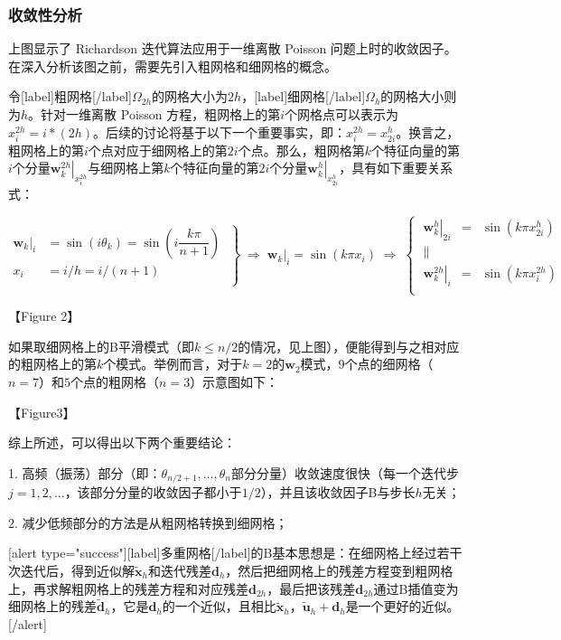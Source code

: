 \documentclass[12pt, UTF8, nofonts]{ctexart}
\begin{document}
\subsubsection*{收敛性分析}

上图显示了 Richardson 迭代算法应用于一维离散 Poisson 问题上时的收敛因子。在深入分析该图之前，需要先引入粗网格和细网格的概念。

令[label]粗网格[/label]$\Omega_{2h}$的网格大小为$2h$，[label]细网格[/label]$\Omega_h$的网格大小则为$h$。针对一维离散 Poisson 方程，粗网格上的第$i$个网格点可以表示为$x_i^{2h}=i*(2h)$。后续的讨论将基于以下一个重要事实，即：$x_i^{2h}=x_{2i}^h$。换言之，粗网格上的第$i$个点对应于细网格上的第$2i$个点。那么，粗网格第$k$个特征向量的第$i$个分量$\left.\boldsymbol{w}_k^{2h}\right|_{x_{i}^{2h}}$与细网格上第$k$个特征向量的第$2i$个分量$\left.\boldsymbol{w}_k^h\right|_{x_{2i}^h}$，具有如下重要关系式：

\begin{equation}
  \label{eq:wiw2i}
  \left.\begin{aligned}
    \left.\boldsymbol{w}_{k}\right|_{i} &= \sin(i\theta_k) = \sin(i\dfrac{k\pi}{n+1}) \\
    x_{i} &= i/h = i/(n+1) \\
  \end{aligned} \;\right\} \;\Rightarrow\;
  \left.\boldsymbol{w}_k\right|_{i} = \sin(k\pi x_i) \;\Rightarrow\;
  \left\{\; \begin{array}{ccc}
    \left.\boldsymbol{w}_{k}^{h}\right|_{2i} & = & \sin(k\pi x_{2i}^h) \\
    \| & & \\
    \left.\boldsymbol{w}_{k}^{2h}\right|_{i} & = & \sin(k\pi x_{i}^{2h}) \\
  \end{array}\right.
\end{equation}

【Figure 2】

如果取细网格上的B平滑模式（即$k\leq n/2$的情况，见上图），便能得到与之相对应的粗网格上的第$k$个模式。举例而言，对于$k=2$的$\boldsymbol{w}_2$模式，$9$个点的细网格（$n=7$）和$5$个点的粗网格（$n=3$）示意图如下：

【Figure3】

综上所述，可以得出以下两个重要结论：

1. 高频（振荡）部分（即：$\theta_{n/2+1},\ldots,\theta_n$部分分量）收敛速度很快（每一个迭代步$j=1,2,\ldots$，该部分分量的收敛因子都小于$1/2$），并且该收敛因子B与步长$h$无关；

2. 减少低频部分的方法是从粗网格转换到细网格；

[alert type="success"][label]多重网格[/label]的B基本思想是：在细网格上经过若干次迭代后，得到近似解$\tilde{\boldsymbol{x}}_h$和迭代残差$\boldsymbol{d}_h$，然后把细网格上的残差方程变到粗网格上，再求解粗网格上的残差方程和对应残差$\boldsymbol{d}_{2h}$，最后把该残差$\boldsymbol{d}_{2h}$通过B插值变为细网格上的残差$\tilde{\boldsymbol{d}}_h$，它是$\boldsymbol{d}_h$的一个近似，且相比$\tilde{\boldsymbol{x}}_h$，$\tilde{\boldsymbol{u}}_h+\boldsymbol{d}_h$是一个更好的近似。[/alert]

\end{document}
